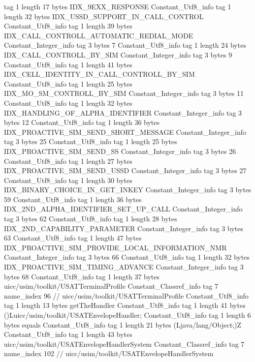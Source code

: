 {{{			tag	1
			length	17
			bytes	IDX_9EXX_RESPONSE
		}
		Constant_Utf8_info {
			tag	1
			length	32
			bytes	IDX_USSD_SUPPORT_IN_CALL_CONTROL
		}
		Constant_Utf8_info {
			tag	1
			length	39
			bytes	IDX_CALL_CONTROLL_AUTOMATIC_REDIAL_MODE
		}
		Constant_Integer_info {
			tag	3
			bytes	7
		}
		Constant_Utf8_info {
			tag	1
			length	24
			bytes	IDX_CALL_CONTROLL_BY_SIM
		}
		Constant_Integer_info {
			tag	3
			bytes	9
		}
		Constant_Utf8_info {
			tag	1
			length	41
			bytes	IDX_CELL_IDENTITY_IN_CALL_CONTROLL_BY_SIM
		}
		Constant_Utf8_info {
			tag	1
			length	25
			bytes	IDX_MO_SM_CONTROLL_BY_SIM
		}
		Constant_Integer_info {
			tag	3
			bytes	11
		}
		Constant_Utf8_info {
			tag	1
			length	32
			bytes	IDX_HANDLING_OF_ALPHA_IDENTIFIER
		}
		Constant_Integer_info {
			tag	3
			bytes	12
		}
		Constant_Utf8_info {
			tag	1
			length	36
			bytes	IDX_PROACTIVE_SIM_SEND_SHORT_MESSAGE
		}
		Constant_Integer_info {
			tag	3
			bytes	25
		}
		Constant_Utf8_info {
			tag	1
			length	25
			bytes	IDX_PROACTIVE_SIM_SEND_SS
		}
		Constant_Integer_info {
			tag	3
			bytes	26
		}
		Constant_Utf8_info {
			tag	1
			length	27
			bytes	IDX_PROACTIVE_SIM_SEND_USSD
		}
		Constant_Integer_info {
			tag	3
			bytes	27
		}
		Constant_Utf8_info {
			tag	1
			length	30
			bytes	IDX_BINARY_CHOICE_IN_GET_INKEY
		}
		Constant_Integer_info {
			tag	3
			bytes	59
		}
		Constant_Utf8_info {
			tag	1
			length	36
			bytes	IDX_2ND_ALPHA_IDENTIFIER_SET_UP_CALL
		}
		Constant_Integer_info {
			tag	3
			bytes	62
		}
		Constant_Utf8_info {
			tag	1
			length	28
			bytes	IDX_2ND_CAPABILITY_PARAMETER
		}
		Constant_Integer_info {
			tag	3
			bytes	63
		}
		Constant_Utf8_info {
			tag	1
			length	47
			bytes	IDX_PROACTIVE_SIM_PROVIDE_LOCAL_INFORMATION_NMR
		}
		Constant_Integer_info {
			tag	3
			bytes	66
		}
		Constant_Utf8_info {
			tag	1
			length	32
			bytes	IDX_PROACTIVE_SIM_TIMING_ADVANCE
		}
		Constant_Integer_info {
			tag	3
			bytes	68
		}
		Constant_Utf8_info {
			tag	1
			length	37
			bytes	uicc/usim/toolkit/USATTerminalProfile
		}
		Constant_Classref_info {
			tag	7
			name_index	96		// uicc/usim/toolkit/USATTerminalProfile
		}
		Constant_Utf8_info {
			tag	1
			length	13
			bytes	getTheHandler
		}
		Constant_Utf8_info {
			tag	1
			length	41
			bytes	()Luicc/usim/toolkit/USATEnvelopeHandler;
		}
		Constant_Utf8_info {
			tag	1
			length	6
			bytes	equals
		}
		Constant_Utf8_info {
			tag	1
			length	21
			bytes	(Ljava/lang/Object;)Z
		}
		Constant_Utf8_info {
			tag	1
			length	43
			bytes	uicc/usim/toolkit/USATEnvelopeHandlerSystem
		}
		Constant_Classref_info {
			tag	7
			name_index	102		// uicc/usim/toolkit/USATEnvelopeHandlerSystem
}}}
